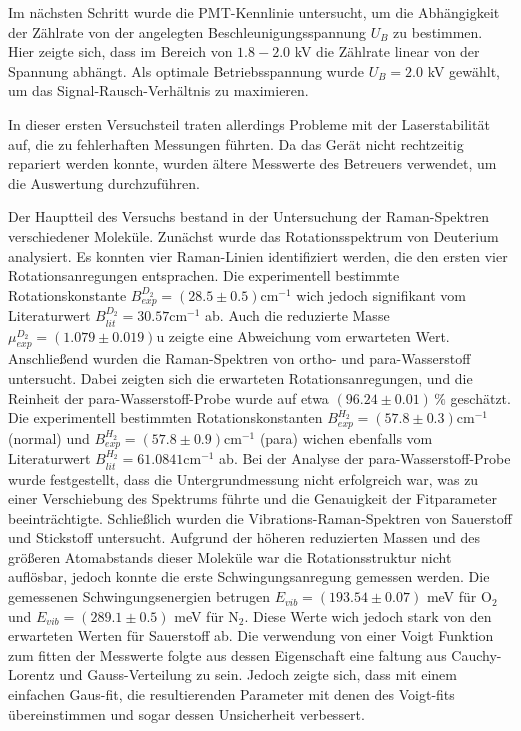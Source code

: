 \documentclass[11pt]{article}
\begin{document}
Im nächsten Schritt wurde die PMT-Kennlinie untersucht, um die Abhängigkeit der Zählrate von der angelegten Beschleunigungsspannung $U_B$ zu bestimmen. Hier zeigte sich, dass im Bereich von $1.8-2.0$ kV die Zählrate linear von der Spannung abhängt. Als optimale Betriebsspannung wurde $U_B = 2.0$ kV gewählt, um das Signal-Rausch-Verhältnis zu maximieren.

In dieser ersten Versuchsteil traten allerdings Probleme mit der Laserstabilität auf, die zu fehlerhaften Messungen führten. Da das Gerät nicht rechtzeitig repariert werden konnte, wurden ältere Messwerte des Betreuers verwendet, um die Auswertung durchzuführen.

Der Hauptteil des Versuchs bestand in der Untersuchung der Raman-Spektren verschiedener Moleküle. Zunächst wurde das Rotationsspektrum von Deuterium analysiert. Es konnten vier Raman-Linien identifiziert werden, die den ersten vier Rotationsanregungen entsprachen. Die experimentell bestimmte Rotationskonstante $B_{exp}^{D_2} = \left(28.5\pm 0.5\right)\mathrm{cm}^{-1}$ wich jedoch signifikant vom Literaturwert $B_{lit}^{D_2} = 30.57\mathrm{cm}^{-1}$ ab. Auch die reduzierte Masse $\mu_{exp}^{D_2} = \left(1.079\pm0.019\right)$u zeigte eine Abweichung vom erwarteten Wert.
Anschließend wurden die Raman-Spektren von ortho- und para-Wasserstoff untersucht. Dabei zeigten sich die erwarteten Rotationsanregungen, und die Reinheit der para-Wasserstoff-Probe wurde auf etwa $\left(96.24\pm0.01\right)\,\%$ geschätzt. Die experimentell bestimmten Rotationskonstanten $B_{exp}^{H_2} = \left(57.8\pm0.3\right)\mathrm{cm}^{-1}$ (normal) und $B_{exp}^{H_2} = \left(57.8\pm0.9\right)\mathrm{cm}^{-1}$ (para) wichen ebenfalls vom Literaturwert $B_{lit}^{H_2} = 61.0841\mathrm{cm}^{-1}$ ab. Bei der Analyse der para-Wasserstoff-Probe wurde festgestellt, dass die Untergrundmessung nicht erfolgreich war, was zu einer Verschiebung des Spektrums führte und die Genauigkeit der Fitparameter beeinträchtigte.
Schließlich wurden die Vibrations-Raman-Spektren von Sauerstoff und Stickstoff untersucht. Aufgrund der höheren reduzierten Massen und des größeren Atomabstands dieser Moleküle war die Rotationsstruktur nicht auflösbar, jedoch konnte die erste Schwingungsanregung gemessen werden. Die gemessenen Schwingungsenergien betrugen \newline$E_{vib} =\left(193.54 \pm 0.07\right)$ meV für O$_2$ und $E_{vib} =\left(289.1 \pm 0.5\right)$ meV für N$_2$. Diese Werte wich jedoch stark von den erwarteten Werten für Sauerstoff ab.
Die verwendung von einer Voigt Funktion zum fitten der Messwerte folgte aus dessen Eigenschaft eine faltung aus Cauchy-Lorentz  und Gauss-Verteilung zu sein. Jedoch zeigte sich, dass mit einem einfachen Gaus-fit, die resultierenden Parameter mit denen des Voigt-fits übereinstimmen und sogar dessen Unsicherheit verbessert.
\end{document}
